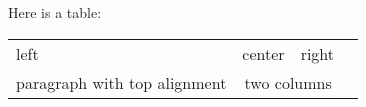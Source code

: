 \documentclass{article}
\begin{document}
Here is a table:

\begin{tabular}{|lp{1.3pt}c|r|}
\hline
left & center & right \\
\cline{2-3}
paragraph with top alignment & \multicolumn{2}{|c|}{two columns} \\
\hline
\end{tabular}
\end{document}
